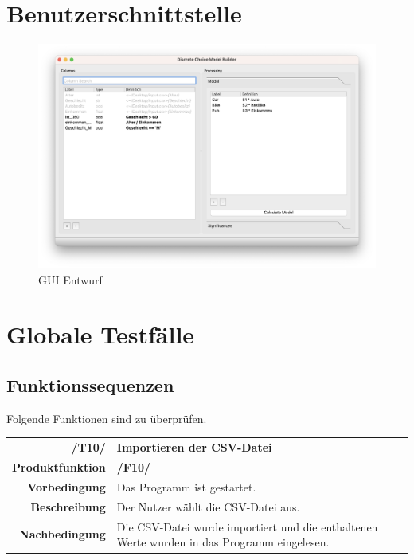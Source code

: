 \documentclass{article}
\begin{document}
\clearpage
\section{Benutzerschnittstelle}
\begin{figure}[H]%
  \centering
  \includegraphics[width=12cm]{specifications/img/gui-screenshots/columns+model.png}
  \caption{GUI Entwurf}
\end{figure}

\clearpage
\section{Globale Testfälle}

\subsection{Funktionssequenzen}
Folgende Funktionen sind zu überprüfen.

\begin{table}[H]
\begin{tabularx}{\textwidth}{rX}
\vspace{1mm}
\textbf{/T10/}         & \textbf{Importieren der CSV-Datei} \\ \vspace{1mm}
\textbf{Produktfunktion} & \textbf{/F10/} \\ \vspace{1mm}
\textbf{Vorbedingung}  & Das Programm ist gestartet. \\ \vspace{1mm}
\textbf{Beschreibung}  & Der Nutzer wählt die CSV-Datei aus. \\
\textbf{Nachbedingung} & Die CSV-Datei wurde importiert und die enthaltenen Werte wurden in das Programm eingelesen.
\end{tabularx}
\end{table}
\end{document}

